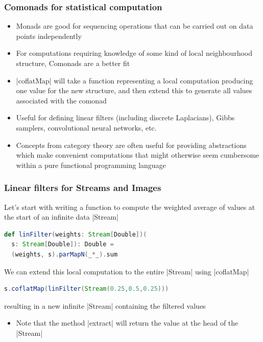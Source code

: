 \documentclass[mathserif,handout]{beamer}
\begin{document}
\begin{frame}[fragile]
  \frametitle{Comonads for statistical computation}
  \begin{itemize}
  \item Monads are good for sequencing operations that can be carried out on data points independently
    \item For computations requiring knowledge of some kind of local neighbourhood structure, \alert{Comonads} are a better fit
    \item |coflatMap| will take a function representing a \alert{local computation} producing one value for the new structure, and then extend this to generate all values associated with the comonad
      \item Useful for defining linear filters (including discrete Laplacians), Gibbs samplers, convolutional neural networks, etc.
\item Concepts from category theory are often useful for providing abstractions which make convenient computations that might otherwise seem cumbersome within a pure functional programming language
  \end{itemize}
\end{frame}

\begin{frame}[fragile]
\frametitle{Linear filters for Streams and Images}  
Let's start with writing a function to compute the weighted average of values at the start of an infinite data |Stream|
\begin{lstlisting}[language=scala]
def linFilter(weights: Stream[Double])(
  s: Stream[Double]): Double =
  (weights, s).parMapN(_*_).sum    
\end{lstlisting}
We can extend this \alert{local computation} to the entire |Stream| using |coflatMap|
\begin{lstlisting}[language=scala]
s.coflatMap(linFilter(Stream(0.25,0.5,0.25)))
\end{lstlisting}
resulting in a new infinite |Stream| containing the filtered values
\begin{itemize}
\item  Note that the method |extract| will return the value at the head of the |Stream|
  \end{itemize}
\end{frame}
\end{document}
